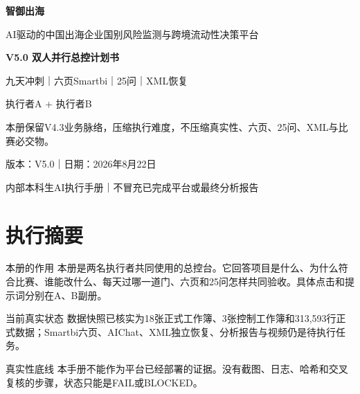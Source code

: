 \documentclass[UTF8,openany,zihao=-4]{ctexbook}
\renewcommand{\_}{\textunderscore\allowbreak}
\begin{document}
\begin{titlepage}
\pagecolor{Navy}\color{white}
\centering
\vspace*{1.8cm}
{\Huge\bfseries 智御出海\par}
\vspace{0.45cm}
{\Large AI驱动的中国出海企业国别风险监测与跨境流动性决策平台\par}
\vspace{1.0cm}
{\LARGE\bfseries V5.0 双人并行总控计划书\par}
\vspace{0.55cm}
{\Large 九天冲刺｜六页Smartbi｜25问｜XML恢复\par}
\vspace{0.8cm}
\begin{tcolorbox}[colback=white!7!Navy,colframe=Gold,width=.88\textwidth,boxrule=1.1pt,arc=1mm]
\centering\large 执行者A + 执行者B
\end{tcolorbox}
\vfill
\begin{tcolorbox}[colback=white!9!Navy,colframe=Gold,width=.88\textwidth,boxrule=1pt,arc=1mm]
本册保留V4.3业务脉络，压缩执行难度，不压缩真实性、六页、25问、XML与比赛必交物。
\end{tcolorbox}
\vfill
{\large 版本：V5.0｜日期：2026年8月22日\par}
{\large 内部本科生AI执行手册｜不冒充已完成平台或最终分析报告\par}
\end{titlepage}
\nopagecolor\color{black}
\frontmatter
\chapter*{执行摘要}
\begin{statusbox}{本册的作用}
本册是两名执行者共同使用的总控台。它回答项目是什么、为什么符合比赛、谁能改什么、每天过哪一道门、六页和25问怎样共同验收。具体点击和提示词分别在A、B副册。

\end{statusbox}
\begin{gatebox}{当前真实状态}
数据快照已核实为18张正式工作簿、3张控制工作簿和313,593行正式数据；Smartbi六页、AIChat、XML独立恢复、分析报告与视频仍是待执行任务。

\end{gatebox}
\begin{dangerbox}{真实性底线}
本手册不能作为平台已经部署的证据。没有截图、日志、哈希和交叉复核的步骤，状态只能是FAIL或BLOCKED。

\end{dangerbox}
\tableofcontents
\mainmatter
\end{document}
